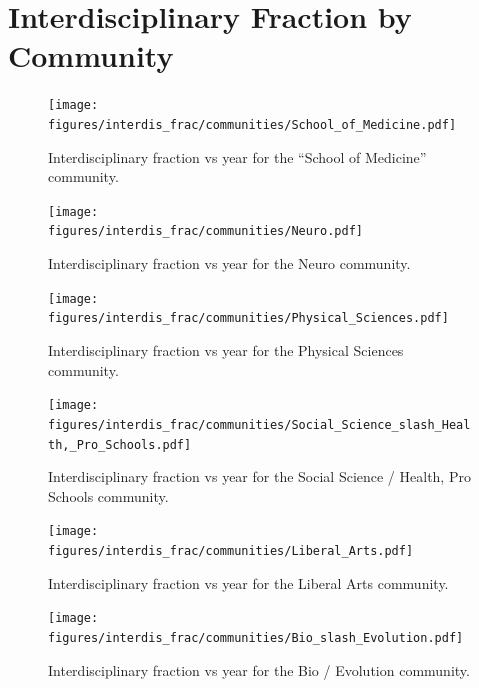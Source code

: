 \documentclass[notitlepage,aps,prd,nofootinbib]{revtex4-1}
\newcommand{\figures}{../outputs/plots}
\begin{document}
\appendix*
\section{Interdisciplinary Fraction by Community}

\begin{figure}[!htb]\centering
  \texttt{[image: \\figures/interdis\_frac/communities/School\_of\_Medicine.pdf]}
  \caption{Interdisciplinary fraction vs year for the ``School of Medicine'' community.}
\end{figure}

\begin{figure}[!htb]\centering
  \texttt{[image: \\figures/interdis\_frac/communities/Neuro.pdf]}
  \caption{Interdisciplinary fraction vs year for the Neuro community.}
\end{figure}

\begin{figure}[!htb]\centering
  \texttt{[image: \\figures/interdis\_frac/communities/Physical\_Sciences.pdf]}
  \caption{Interdisciplinary fraction vs year for the Physical Sciences community.}
\end{figure}

\begin{figure}[!htb]\centering
  \texttt{[image: \\figures/interdis\_frac/communities/Social\_Science\_slash\_Health,\_Pro\_Schools.pdf]}
  \caption{Interdisciplinary fraction vs year for the Social Science / Health, Pro Schools community.}
\end{figure}

\begin{figure}[!htb]\centering
  \texttt{[image: \\figures/interdis\_frac/communities/Liberal\_Arts.pdf]}
  \caption{Interdisciplinary fraction vs year for the Liberal Arts community.}
\end{figure}

\begin{figure}[!htb]\centering
  \texttt{[image: \\figures/interdis\_frac/communities/Bio\_slash\_Evolution.pdf]}
  \caption{Interdisciplinary fraction vs year for the Bio / Evolution community.}
\end{figure}
\end{document}
